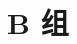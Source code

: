 \section*{B 组}
\begin{question}
  \item 
  \item 
  \item 
  \item 
  \item 
  \item 
  \item 
\end{question}